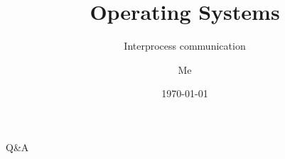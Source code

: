 \documentclass[12pt]{beamer}
\title{Operating Systems}
\subtitle{Interprocess communication}
\author{Me}
\date{\today}
\begin{document}
  \begin{frame}
    \titlepage
  \end{frame}

  
  
  
  

  \begin{frame}
  \begin{center}
  \Huge Q\&A
  \end{center}
  \end{frame}
\end{document}
